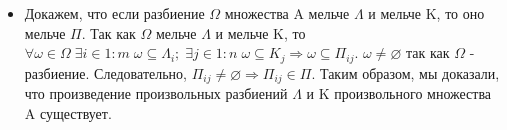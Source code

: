 \begin{itemize}
\item Докажем, что если разбиение $\Omega$ множества A мельче $\Lambda$ и мельче K, то оно мельче $\Pi$. Так как $\Omega$ мельче $\Lambda$ и мельче K, то $\forall \omega \in \Omega \; \exists i \in 1 : m \; \omega \subseteq \Lambda_{i}; \; \exists j \in 1 : n \; \omega \subseteq K_{j} \Rightarrow \omega \subseteq \Pi_{ij}$. $\omega \not= \varnothing$ так как $\Omega$ - разбиение. Следовательно, $\Pi_{ij} \not= \varnothing \Rightarrow \Pi_{ij} \in \Pi$. Таким образом, мы доказали, что произведение произвольных разбиений $\Lambda$ и K произвольного множества A существует.
\end{itemize}